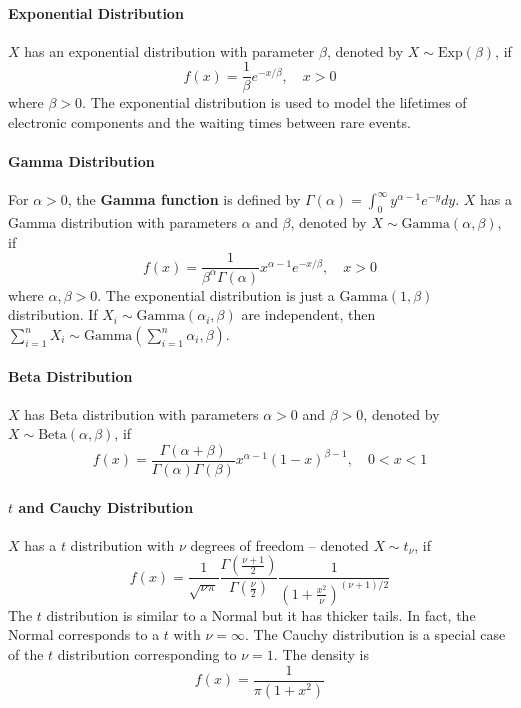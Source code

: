\paragraph{Exponential Distribution}\label{exponential-distribution}
\(X\) has an exponential distribution with parameter \(\beta\), denoted by \(X \sim \text{Exp}(\beta)\), if
\[
f(x) = \frac{1}{\beta} e^{-x / \beta}, \quad x > 0
\]
where \(\beta > 0\). The exponential distribution is used to model the lifetimes of electronic components and the waiting times between rare events.
\paragraph{Gamma Distribution}\label{gamma-distribution}
For \(\alpha > 0\), the \textbf{Gamma function} is defined by \(\Gamma(\alpha) = \int_{0}^{\infty} y^{\alpha - 1} e^{-y} dy\). \(X\) has a Gamma distribution with parameters \(\alpha\) and \(\beta\), denoted by \(X \sim \text{Gamma}(\alpha, \beta)\), if
\[
f(x) = \frac{1}{\beta^\alpha \Gamma(\alpha)} x^{\alpha - 1} e^{-x / \beta}, \quad x > 0
\]
where \(\alpha, \beta > 0\). The exponential distribution is just a \(\text{Gamma}(1, \beta)\) distribution. If \(X_{i} \sim \text{Gamma}(\alpha_{i}, \beta)\) are independent, then \(\sum_{i=1}^{n} X_{i} \sim \text{Gamma}\left( \sum_{i=1}^{n} \alpha_{i}, \beta \right)\).
\paragraph{Beta Distribution}\label{beta-distribution}
\(X\) has Beta distribution with parameters \(\alpha > 0\) and \(\beta > 0\), denoted by \(X \sim \text{Beta}(\alpha, \beta)\), if
\[
f(x) = \frac{\Gamma(\alpha + \beta)}{\Gamma(\alpha) \Gamma(\beta)} x^{\alpha - 1} (1 - x)^{\beta - 1}, \quad 0 < x < 1
\]
\paragraph{\texorpdfstring{\(t\) and Cauchy Distribution}{t and Cauchy Distribution}}\label{t-and-cauchy-distribution}
\(X\) has a \(t\) distribution with \(\nu\) degrees of freedom -- denoted \(X \sim t_\nu\), if
\[
f(x) = \frac{1}{\sqrt{\nu \pi}} \frac{\Gamma\left( \frac{\nu + 1}{2} \right)}{\Gamma\left( \frac{\nu}{2} \right)} \frac{1}{\left(1 + \frac{x^{2}}{\nu} \right)^{(\nu + 1) / 2}} 
\]
The \(t\) distribution is similar to a Normal but it has thicker tails. In fact, the Normal corresponds to a \(t\) with \(\nu = \infty\). The Cauchy distribution is a special case of the \(t\) distribution corresponding to \(\nu = 1\). The density is
\[
f(x) = \frac{1}{\pi (1 + x^{2})}
\]
